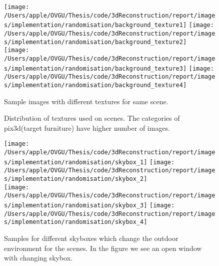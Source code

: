 \begin{figure}[ht]
    \centering
    \texttt{[image: /Users/apple/OVGU/Thesis/code/3dReconstruction/report/images/implementation/randomisation/background\_texture1]}
    \texttt{[image: /Users/apple/OVGU/Thesis/code/3dReconstruction/report/images/implementation/randomisation/background\_texture2]}\\
    \vspace{0.1cm}
    \texttt{[image: /Users/apple/OVGU/Thesis/code/3dReconstruction/report/images/implementation/randomisation/background\_texture3]}
    \texttt{[image: /Users/apple/OVGU/Thesis/code/3dReconstruction/report/images/implementation/randomisation/background\_texture4]}\\
    \caption{Sample images with different textures for same scene.}
    \label{fig:Texture Randomisation}
\end{figure}



\begin{figure}[ht]
    \centering
    \resizebox{\textwidth}{!}{}
    \caption{Distribution of textures used on scenes. The categories of pix3d(target furniture) have higher number of images.}
    \label{fig:Distribution of textures}
\end{figure}

\begin{figure}
    \centering
    \texttt{[image: /Users/apple/OVGU/Thesis/code/3dReconstruction/report/images/implementation/randomisation/skybox\_1]}
    \texttt{[image: /Users/apple/OVGU/Thesis/code/3dReconstruction/report/images/implementation/randomisation/skybox\_2]} \\
    \vspace{0.1cm}
    \texttt{[image: /Users/apple/OVGU/Thesis/code/3dReconstruction/report/images/implementation/randomisation/skybox\_3]}
    \texttt{[image: /Users/apple/OVGU/Thesis/code/3dReconstruction/report/images/implementation/randomisation/skybox\_4]}\\
    \caption{Samples for different skyboxes which change the outdoor environment for the scenes. In the figure we see an open window with changing skybox.}
    \label{fig:skybox samples}
\end{figure}

